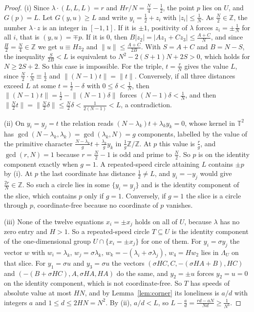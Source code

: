\documentclass[12pt]{amsart}
\theoremstyle{definition}\newtheorem{definition}[theorem]{Definition}
\theoremstyle{remark}\newtheorem{remark}[theorem]{Remark}
\newcommand{\Z}{\mathbb Z}\newcommand{\R}{\mathbb R}\newcommand{\T}{\mathbb T}
\newcommand{\norm}[1]{\lVert #1\rVert}
\begin{document}
\begin{proof}
(i) Since $\lambda\cdot(L,L,L)=r$ and $Hr/N=\frac N4-\frac12$, the point $p$ lies on $U$, and $G(p)=L$. Let $G(y,u)\ge L$ and write $y_i=\frac12+z_i$ with $|z_i|\le\frac1N$. As $\frac N2\in\Z$, the number $\lambda\cdot z$ is an integer in $[-1,1]$. If it is $\pm1$, positivity of $\lambda$ forces $z_i=\pm\frac1N$ for all $i$, that is $(y,u)=\mp p$. If it is $0$, then $B|z_2|=|Az_1+Cz_3|\le\frac{A+C}N$, and since $\frac H2=\frac N4\in\Z$ we get $u\equiv Hz_2$ and $\norm u\le\frac{A+C}{2B}$. With $S=A+C$ and $B=N-S$, the inequality $\frac S{2B}<L$ is equivalent to $N^2-2(S+1)N+2S>0$, which holds for $N\ge2S+2$. So this case is impossible. For the triple, $t=\frac rN$ gives the value $L$, since $\frac N2\cdot\frac rN\equiv\frac12$ and $\norm{(N-1)t}=\norm{t}$. Conversely, if all three distances exceed $L$ at some $t=\frac12-\delta$ with $0\le\delta<\frac1N$, then $\norm{(N-1)t}=\frac12-\norm{(N-1)\delta}$ forces $(N-1)\delta<\frac1N$, and then $\norm{\frac N2t}=\norm{\frac N2\delta}\le\frac N2\delta<\frac1{2(N-1)}<L$, a contradiction.

(ii) On $y_i=y_j=t$ the relation reads $(N-\lambda_k)t+\lambda_ky_k=0$, whose kernel in $\T^2$ has $\gcd(N-\lambda_k,\lambda_k)=\gcd(\lambda_k,N)=g$ components, labelled by the value of the primitive character $\frac{N-\lambda_k}g t+\frac{\lambda_k}g y_k$ in $\frac1g\Z/\Z$. At $p$ this value is $\frac rg$, and $\gcd(r,N)=1$ because $r=\frac N2-1$ is odd and prime to $\frac N2$. So $p$ is on the identity component exactly when $g=1$. A repeated-speed circle attaining $L$ contains $\pm p$ by (i). At $p$ the last coordinate has distance $\frac12\ne L$, and $y_i=-y_j$ would give $\frac{2r}N\in\Z$. So such a circle lies in some $\{y_i=y_j\}$ and is the identity component of the slice, which contains $p$ only if $g=1$. Conversely, if $g=1$ the slice is a circle through $p$, coordinate-free because no coordinate of $p$ vanishes.

(iii) None of the twelve equations $x_i=\pm x_j$ holds on all of $U$, because $\lambda$ has no zero entry and $H>1$. So a repeated-speed circle $T\subseteq U$ is the identity component of the one-dimensional group $U\cap\{x_i=\pm x_j\}$ for one of them. For $y_i=\sigma y_j$ the vector $w$ with $w_i=\lambda_k$, $w_j=\sigma\lambda_k$, $w_k=-(\lambda_i+\sigma\lambda_j)$, $w_4=Hw_2$ lies in $\Lambda_U$ on that slice. For $y_1=\sigma u$ and $y_3=\sigma u$ the vectors $(\sigma HC,C,-(\sigma HA+B),HC)$ and $(-(B+\sigma HC),A,\sigma HA,HA)$ do the same, and $y_2=\pm u$ forces $y_2=u=0$ on the identity component, which is not coordinate-free. So $T$ has speeds of absolute value at most $HN$, and by Lemma~\ref{lem:corner} its loneliness is $a/d$ with integers $a$ and $1\le d\le2HN=N^2$. By (ii), $a/d<L$, so $L-\frac ad=\frac{rd-aN}{Nd}\ge\frac1{N^3}$.
\end{proof}
\end{document}
